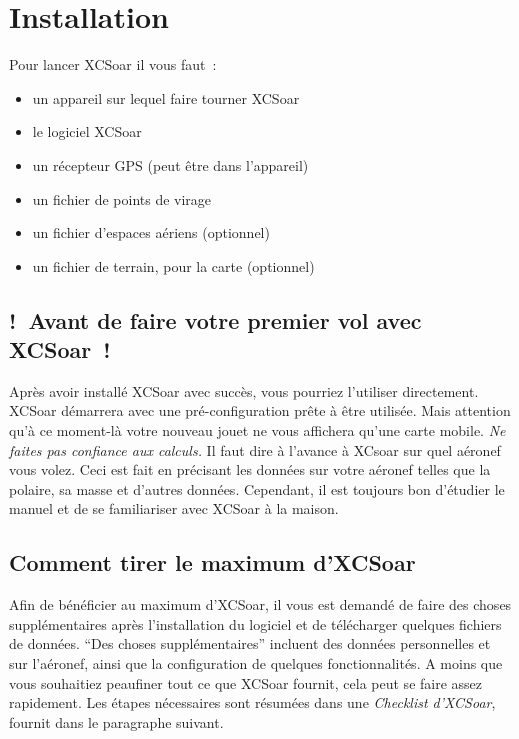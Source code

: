 
\chapter{Installation}\label{cha:installation}

Pour lancer XCSoar il vous faut~:
\begin{itemize}
\item un appareil sur lequel faire tourner XCSoar
\item le logiciel XCSoar
\item un récepteur GPS (peut être dans l'appareil)
\item un fichier de points de virage
\item un fichier d'espaces aériens (optionnel)
\item un fichier de terrain, pour la carte (optionnel)
\end{itemize}

\section{!~Avant de faire votre premier vol avec XCSoar~!}

Après avoir installé XCSoar avec succès, vous pourriez l'utiliser directement. XCSoar
démarrera avec une pré-configuration prête à être utilisée. Mais attention qu'à 
ce moment-là votre nouveau jouet ne vous affichera qu'une carte mobile.
\warning \emph{Ne faites pas confiance aux calculs.} Il faut dire à l'avance à XCsoar sur quel
aéronef vous volez. Ceci est fait en précisant les données sur votre aéronef
telles que la polaire, sa masse et d'autres données. Cependant, il est toujours bon
d'étudier le manuel et de se familiariser avec XCSoar à la maison.

\section{Comment tirer le maximum d'XCSoar}

Afin de bénéficier au maximum d'XCSoar, il vous est demandé de
faire des choses supplémentaires après l'installation du logiciel et de télécharger quelques fichiers
de données. ``Des choses supplémentaires'' incluent des données personnelles et sur l'aéronef, ainsi que la configuration
de quelques fonctionnalités. A moins que vous souhaitiez peaufiner tout ce que XCSoar
fournit, cela peut se faire assez rapidement. Les étapes nécessaires sont
résumées dans une \emph{Checklist d'XCSoar}, fournit dans le paragraphe suivant.

